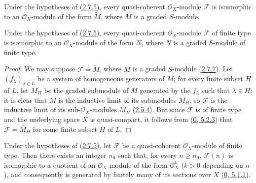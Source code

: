 \begin{corollary}[2.7.7]
\label{II.2.7.7}
Under the hypotheses of (\hyperref[II.2.7.5]{2.7.5}), every
quasi-coherent $\mathcal{O}_X$-module $\mathcal{F}$ is isomorphic to an
$\mathcal{O}_X$-module of the form $\widetilde{M}$, where $M$ is a graded
$S$-module.
\end{corollary}

\begin{corollary}[2.7.8]
\label{II.2.7.8}
Under the hypotheses of (\hyperref[II.2.7.5]{2.7.5}), every
quasi-coherent $\mathcal{O}_X$-module $\mathcal{F}$ of finite type is
isomorphic to an $\mathcal{O}_X$-module of the form $\widetilde{N}$, where $N$
is a graded $S$-module of finite type.
\end{corollary}

\begin{proof}
We may suppose $\mathcal{F}=\widetilde{M}$, where $M$ is a graded $S$-module
(\hyperref[II.2.7.7]{2.7.7}). Let $(f_\lambda)_{\lambda\in L}$ be a
system of homogeneous generators of $M$; for every finite subset $H$ of $L$,
let $M_H$ be the graded submodule of $M$ generated by the $f_\lambda$ such
that $\lambda\in H$; it is clear that $M$ is the inductive limit of its
submodules $M_H$, so $\mathcal{F}$ is the inductive limit of its
sub-$\mathcal{O}_X$-modules $\widetilde{M_H}$ (\hyperref[II.2.5.4]{2.5.4}).
But since $\mathcal{F}$ is of finite type and the underlying space $X$ is
quasi-compact, it follows from (\hyperref[0.5.2.3]{0, 5.2.3}) that
$\mathcal{F}=\widetilde{M_H}$ for some finite subset $H$ of $L$.
\end{proof}

\begin{corollary}[2.7.9]
\label{II.2.7.9}
Under the hypotheses of (\hyperref[II.2.7.5]{2.7.5}), let $\mathcal{F}$ be
a quasi-coherent $\mathcal{O}_X$-module of finite type. Then there exists an
integer $n_0$ such that, for every $n\geq n_0$, $\mathcal{F}(n)$ is isomorphic
to a quotient of an $\mathcal{O}_X$-module of the form $\mathcal{O}_X^k$ ($k>0$
depending on $n$), and consequently is generated by finitely many of its
sections over $X$ (\hyperref[0.5.1.1]{0, 5.1.1}).
\end{corollary}

